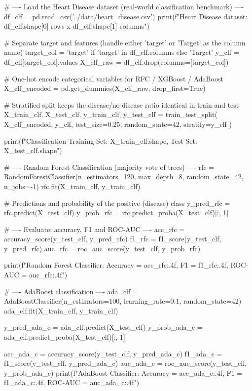 \begin{codebox}[title={Load the Heart Disease dataset (real-world classification benchmark)}]
# ---- Load the Heart Disease dataset (real-world classification benchmark) ----
df_clf = pd.read_csv('../data/heart_disease.csv')
print(f"Heart Disease dataset: {df_clf.shape[0]} rows x {df_clf.shape[1]} columns")

# Separate target and features (handle either 'target' or 'Target' as the column name)
target_col = 'target' if 'target' in df_clf.columns else 'Target'
y_clf = df_clf[target_col].values
X_clf_raw = df_clf.drop(columns=[target_col])

# One-hot encode categorical variables for RFC / XGBoost / AdaBoost
X_clf_encoded = pd.get_dummies(X_clf_raw, drop_first=True)

# Stratified split keeps the disease/no-disease ratio identical in train and test
X_train_clf, X_test_clf, y_train_clf, y_test_clf = train_test_split(
    X_clf_encoded, y_clf, test_size=0.25, random_state=42, stratify=y_clf
)

print(f"Classification Training Set: {X_train_clf.shape}, Test Set: {X_test_clf.shape}")

# ---- Random Forest Classification (majority vote of trees) ----
rfc = RandomForestClassifier(n_estimators=120, max_depth=8, random_state=42, n_jobs=-1)
rfc.fit(X_train_clf, y_train_clf)

# Predictions and probability of the positive (disease) class
y_pred_rfc = rfc.predict(X_test_clf)
y_prob_rfc = rfc.predict_proba(X_test_clf)[:, 1]

# ---- Evaluate: accuracy, F1 and ROC-AUC ----
acc_rfc = accuracy_score(y_test_clf, y_pred_rfc)
f1_rfc = f1_score(y_test_clf, y_pred_rfc)
auc_rfc = roc_auc_score(y_test_clf, y_prob_rfc)

print(f"Random Forest Classifier: Accuracy = {acc_rfc:.4f}, F1 = {f1_rfc:.4f}, ROC-AUC = {auc_rfc:.4f}")
\end{codebox}

\begin{codebox}[title={AdaBoost classification}]
# ---- AdaBoost classification ----
ada_clf = AdaBoostClassifier(n_estimators=100, learning_rate=0.1, random_state=42)
ada_clf.fit(X_train_clf, y_train_clf)

y_pred_ada_c = ada_clf.predict(X_test_clf)
y_prob_ada_c = ada_clf.predict_proba(X_test_clf)[:, 1]

acc_ada_c = accuracy_score(y_test_clf, y_pred_ada_c)
f1_ada_c = f1_score(y_test_clf, y_pred_ada_c)
auc_ada_c = roc_auc_score(y_test_clf, y_prob_ada_c)
print(f"AdaBoost Classifier:  Accuracy = {acc_ada_c:.4f}, F1 = {f1_ada_c:.4f}, ROC-AUC = {auc_ada_c:.4f}")
\end{codebox}
